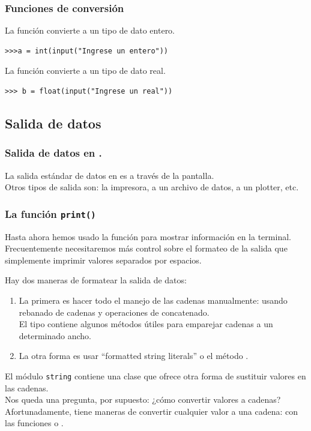 \begin{frame}[fragile]
\frametitle{Funciones de conversión}
La función  convierte a un tipo de dato entero.
\begin{verbatim}
>>>a = int(input("Ingrese un entero"))
\end{verbatim}
\bigskip
\pause
La función  convierte a un tipo de dato real.
\begin{verbatim}
>>> b = float(input("Ingrese un real"))
\end{verbatim}
\end{frame}
\subsection{Salida de datos}
\begin{frame}
\frametitle{Salida de datos en \python.}
La salida estándar de datos en \python{} es a través de la pantalla.
\\
\bigskip
Otros tipos de salida son: la impresora, a un archivo de datos, a un plotter, etc.
\end{frame}
\begin{frame}
\frametitle{La función \texttt{print()}}
Hasta ahora hemos usado la función  para mostrar información en la terminal.
\\
\bigskip
Frecuentemente necesitaremos más control sobre el formateo de la salida que simplemente imprimir valores separados por espacios.
\end{frame}
\begin{frame}
Hay dos maneras de formatear la salida de datos:
\begin{enumerate}[<+->]
\item La primera es hacer todo el manejo de las cadenas manualmente: usando rebanado de cadenas y operaciones de concatenado. 
\\
\bigskip
El tipo  contiene algunos métodos útiles para emparejar cadenas a un determinado ancho.
\item La otra forma es usar \enquote{formatted string literals} o el método .
\end{enumerate}
\end{frame}
\begin{frame}
El módulo \texttt{string} contiene una clase  que ofrece otra forma de sustituir valores en las cadenas.
\\
\bigskip
Nos queda una pregunta, por supuesto: ¿cómo convertir valores a cadenas?
\\
\bigskip
\pause
Afortunadamente, \python{} tiene maneras de convertir cualquier valor a una cadena: con las funciones  o .
\end{frame}
